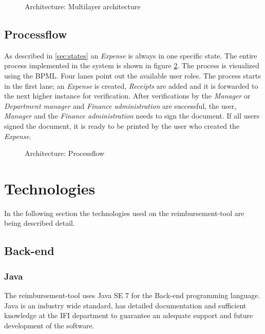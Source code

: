 \begin{figure}[H]
    \centering
    \caption{Architecture: Multilayer architecture}
    \label{fig:architecture-layer}
\end{figure}

\subsection{Processflow}
\label{sec:processflow}
As described in \ref{sec:states} an \textit{Expense} is always in one specific state. The entire process implemented in the system is shown in figure \ref{fig:process-diagram}. The process is visualized using the BPML. Four lanes point out the available user roles. The process starts in the first lane; an \textit{Expense} is created, \textit{Receipts} are added and it is forwarded to the next higher instance for verification. After verifications by the \textit{Manager} or \textit{Department manager} and \textit{Finance administration} are successful, the user, \textit{Manager} and the \textit{Finance administration} needs to sign the document. If all users signed the document, it is ready to be printed by the user who created the \textit{Expense}.

\begin{figure}[H]
    \centering
    \caption{Architecture: Processflow}
    \label{fig:process-diagram}
\end{figure}


\section{Technologies}

In the following section the technologies used on the reimbursement-tool are being described detail.

\subsection{Back-end}

\subsubsection{Java}
The reimbursement-tool uses Java SE 7 for the Back-end programming language. Java is an industry wide standard, has detailed documentation and sufficient knowledge at the IFI \cite{ifi} department to guarantee an adequate support and future development of the software.

